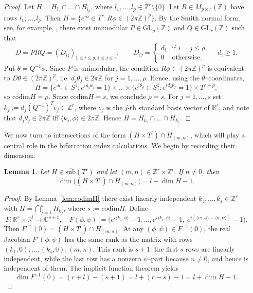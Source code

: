 \documentclass[reqno,twoside,12pt]{amsart}
\newtheorem{Lemma}[Remark]{Lemma}
\numberwithin{equation}{section} \errorcontextlines=0
\newcommand{\codim}{\mathrm{ codim  }}
\newcommand{\sub}{\overline{\mathrm{sub}}}
\begin{document}
\begin{proof}
Let
$H=H_{l_1}\cap\ldots\cap H_{l_p}$, where $l_1,\ldots,l_p\in \mathbb{Z}^r\setminus\{0\}$.
Let $R \in M_{p\times r}(\mathbb{Z})$ have rows $l_1,\dots,l_p$. Then
$
H=\{e^{i\phi}\in T^r : R\phi \in (2\pi\mathbb{Z})^{p}\}.
$
By the Smith normal form, see, for example, \cite[Theorem 6.6]{Matthews}, there exist unimodular $P \in \mathrm{GL}_p(\mathbb{Z})$ and
$Q \in \mathrm{GL}_r(\mathbb{Z})$ such that
\[
D=PRQ=(D_{ij})_{1\le i\le p, 1\le j\le r},\qquad
D_{ij}=\begin{cases}
d_i & \text{if } i=j\le \rho,\\
0 & \text{otherwise},
\end{cases}
\quad d_i\ge 1.
\]
Put $\theta = Q^{-1}\phi$. Since $P$ is unimodular, the condition $R\phi \in (2\pi\mathbb{Z})^{p}$
is equivalent to $D\theta \in (2\pi\mathbb{Z})^{p}$, i.e. $d_j\theta_j\in 2\pi\mathbb{Z}$ for
$j=1,\dots,\rho$. Hence, using the $\theta$–coordinates,
\[
H=\{e^{i\theta_1}\in S^1:e^{i d_1\theta_1}=1\}\times \ldots \times \{e^{i\theta_\rho}\in S^1:e^{i d_\rho\theta_\rho}=1\} \times T^{r-\rho},
\]
so $\codim H=\rho$. Since $\codim H=s$, we conclude $\rho=s$.
For $j=1,\dots,s$ set $k_j := d_j (Q^{-1})^{T} e_j \in \mathbb{Z}^r$, where $e_j$ is the $j$-th standard basis vector of $\mathbb{R}^r$,
and note that $d_j\theta_j\in 2\pi\mathbb{Z}$ iff $\langle k_j,\phi\rangle\in 2\pi\mathbb{Z}$.
Hence $H=H_{k_1}\cap\ldots\cap H_{k_s}$.
\end{proof}

We now turn to intersections of the form $(H\times T^{l})\cap H_{(m,n)}$, which will play a central role in the bifurcation index calculations. We begin by recording their dimension.

\begin{Lemma}\label{lem:dim}
Let $H \in \sub(T^r)$ and let $(m,n)\in\mathbb Z^r\times\mathbb Z^l$. If $n\neq 0$, then
\[
\dim\big((H\times T^{l})\cap H_{(m,n)}\big)=l+\dim H-1.
\]
\end{Lemma}
\begin{proof}
By Lemma~\ref{lem:codimH} there exist linearly independent $k_1,\dots,k_s\in\mathbb{Z}^r$ with
$H=\bigcap_{j=1}^s H_{k_j}$, where $s:=\codim H$. Define
\[
F\colon \mathbb{R}^r\times\mathbb{R}^l\to \mathbb{C}^{s+1},\quad
F(\phi,\psi):=\bigl(e^{i\langle k_1,\phi\rangle}-1,\dots,e^{i\langle k_s,\phi\rangle}-1,\ e^{i(\langle m,\phi\rangle+\langle n,\psi\rangle)}-1\bigr).
\]
Then $F^{-1}(0)=(H\times T^{l})\cap H_{(m,n)}$. At any $(\phi,\psi)\in F^{-1}(0)$, the real Jacobian $F'(\phi,\psi)$ has the same rank as the matrix with rows
$
(k_1,0), \dots, (k_s,0), (m,n).
$
This rank is $s+1$: the first $s$ rows are linearly independent, while the last row has a nonzero $\psi$--part because $n\neq 0$, and hence is independent of them. The implicit function theorem yields
\[
\dim F^{-1}(0)=(r+l)-(s+1)=l+(r-s)-1=l+\dim H-1.
\]
\end{proof}
\end{document}
